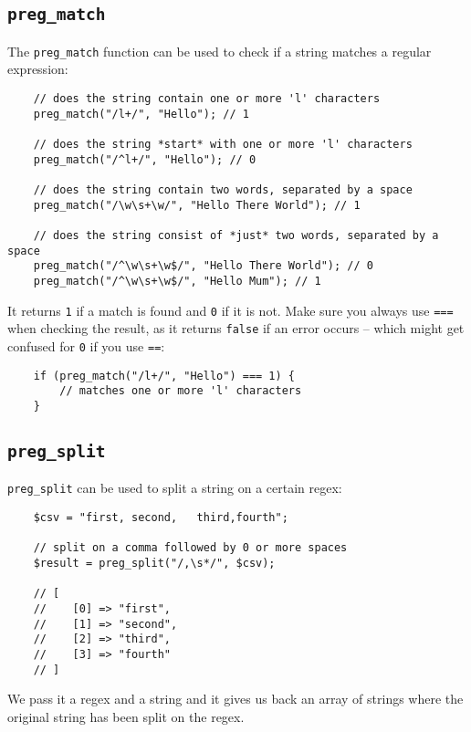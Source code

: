 \subsection{\texttt{preg\_match}}

The \texttt{preg\_match} function can be used to check if a string matches a regular expression:

\begin{verbatim}
    // does the string contain one or more 'l' characters
    preg_match("/l+/", "Hello"); // 1

    // does the string *start* with one or more 'l' characters
    preg_match("/^l+/", "Hello"); // 0

    // does the string contain two words, separated by a space
    preg_match("/\w\s+\w/", "Hello There World"); // 1

    // does the string consist of *just* two words, separated by a space
    preg_match("/^\w\s+\w$/", "Hello There World"); // 0
    preg_match("/^\w\s+\w$/", "Hello Mum"); // 1
\end{verbatim}

It returns \texttt{1} if a match is found and \texttt{0} if it is not. Make sure you always use \texttt{===} when checking the result, as it returns \texttt{false} if an error occurs – which might get confused for \texttt{0} if you use \texttt{==}:

\begin{verbatim}
    if (preg_match("/l+/", "Hello") === 1) {
        // matches one or more 'l' characters
    }
\end{verbatim}

\pagebreak

\subsection{\texttt{preg\_split}}

\texttt{preg\_split} can be used to split a string on a certain regex:

\begin{verbatim}
    $csv = "first, second,   third,fourth";

    // split on a comma followed by 0 or more spaces
    $result = preg_split("/,\s*/", $csv);

    // [
    //    [0] => "first",
    //    [1] => "second",
    //    [2] => "third",
    //    [3] => "fourth"
    // ]
\end{verbatim}

We pass it a regex and a string and it gives us back an array of strings where the original string has been split on the regex.

